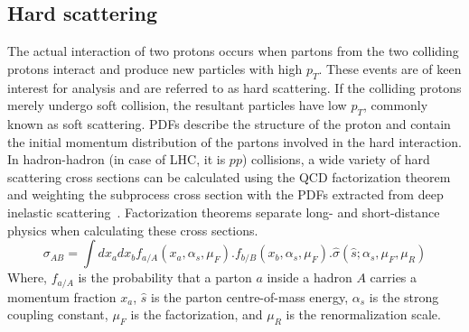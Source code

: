 \subsection{Hard scattering}
The actual interaction of two protons occurs when partons from the two colliding protons interact and produce new particles with high $p_{T}$. These events are of keen interest for analysis and are referred to as hard scattering. If the colliding protons merely undergo soft collision, the resultant particles have low $p_{T}$, commonly known as soft scattering. PDFs describe the structure of the proton and contain the initial momentum distribution of the partons involved in the hard interaction. In hadron-hadron (in case of LHC, it is $pp$) collisions, a wide variety of hard scattering cross sections can be calculated using the QCD factorization theorem and weighting the subprocess cross section with the PDFs extracted from deep inelastic scattering~\cite{hard_scatter}. Factorization theorems separate long- and short-distance physics when calculating these cross sections.   
\begin{equation}\label{eq:xsec}
\sigma_{AB} = \int dx_{a}dx_{b}f_{a/A}(x_{a},\alpha_{s},\mu_{F}).f_{b/B}(x_{b},\alpha_{s},\mu_{F}).\hat{\sigma}(\hat{s};\alpha_{s},\mu_{F},\mu_{R})
\end{equation}  
Where, $f_{a/A}$ is the probability that a parton $a$ inside a hadron $A$ carries a momentum fraction $x_{a}$, $\hat{s}$ is the parton centre-of-mass energy, $\alpha_{s}$ is the strong coupling constant, $\mu_{F}$ is the factorization, and $\mu_{R}$ is the renormalization scale.


